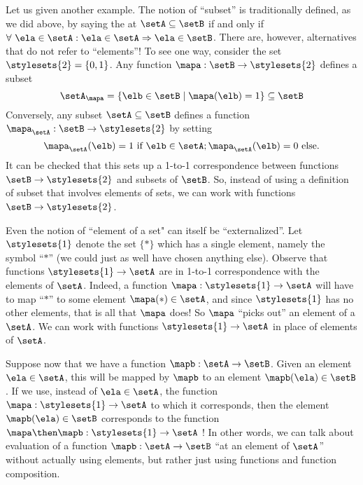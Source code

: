 Let us given another example. The notion of ``subset'' is traditionally defined, as we did above, by saying the at $\setA \subseteq \setB$ if and only if $\forall \ \ela \in \setA : \ela \in \setA \Rightarrow \ela \in \setB$. There are, however, alternatives that do not refer to ``elements''! To see one way, consider the set $\stylesets{2} = \{ 0, 1\}$. Any function $\mapa : \setB \to \stylesets{2}$ defines a subset 
\begin{equation}
\setA_\mapa = \{ \elb \in \setB \mid \mapa(\elb) = 1 \} \subseteq \setB
\end{equation}
Conversely, any subset $\setA \subseteq \setB$ defines a function $\mapa_\setA : \setB \to \stylesets{2}$ by setting 
\begin{equation}
\mapa_\setA(\elb) = 1 \text{ if } \elb \in \setA; \mapa_\setA(\elb) = 0 \text{ else}. 
\end{equation}
It can be checked that this sets up a 1-to-1 correspondence between functions $\setB \to \stylesets{2}$ and subsets of $\setB$. So, instead of using a definition of subset that involves elements of sets, we can work with functions $\setB \to \stylesets{2}$. 

Even the notion of ``element of a set" can itself be ``externalized''. Let $\stylesets{1}$ denote the set $\{ * \}$ which has a single element, namely the symbol ``$*$'' (we could just as well have chosen anything else). Observe that functions $\stylesets{1} \to \setA$ are in 1-to-1 correspondence with the elements of $\setA$. Indeed, a function $\mapa: \stylesets{1} \to \setA$ will have to map ``$*$'' to some element $\mapa(*) \in \setA$, and since $\stylesets{1}$ has no other elements, that is all that $\mapa$ does! So $\mapa$ ``picks out'' an element of a $\setA$. We can work with functions $\stylesets{1} \to \setA$ in place of elements of $\setA$.


Suppose now that we have a function $\mapb : \setA \to \setB$. Given an element $\ela \in \setA$, this will be mapped by $\mapb$ to an element $\mapb(\ela) \in \setB$. If we use, instead of $\ela \in \setA$, the function $\mapa : \stylesets{1} \to \setA$ to which it corresponds, then the element $\mapb(\ela) \in \setB$ corresponds to the function $\mapa \then \mapb: \stylesets{1} \to \setA$ ! In other words, we can talk about evaluation of a function $\mapb : \setA \to \setB$ ``at an element of $\setA$'' without actually using elements, but rather just using functions and function composition. 


\

\









\clearpage

